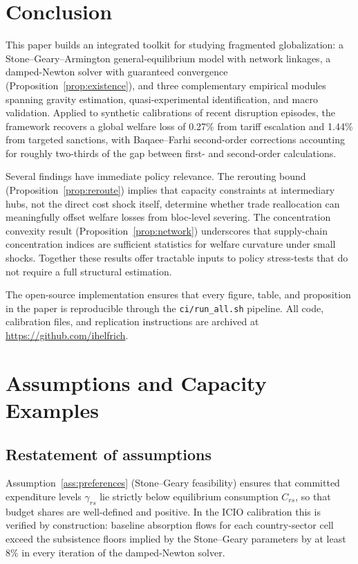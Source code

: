 \documentclass[12pt]{article}
\begin{document}
\section{Conclusion}
This paper builds an integrated toolkit for studying fragmented globalization: a Stone--Geary--Armington general-equilibrium model with network linkages, a damped-Newton solver with guaranteed convergence (Proposition~\ref{prop:existence}), and three complementary empirical modules spanning gravity estimation, quasi-experimental identification, and macro validation. Applied to synthetic calibrations of recent disruption episodes, the framework recovers a global welfare loss of 0.27\% from tariff escalation and 1.44\% from targeted sanctions, with Baqaee--Farhi second-order corrections accounting for roughly two-thirds of the gap between first- and second-order calculations.

Several findings have immediate policy relevance. The rerouting bound (Proposition~\ref{prop:reroute}) implies that capacity constraints at intermediary hubs, not the direct cost shock itself, determine whether trade reallocation can meaningfully offset welfare losses from bloc-level severing. The concentration convexity result (Proposition~\ref{prop:network}) underscores that supply-chain concentration indices are sufficient statistics for welfare curvature under small shocks. Together these results offer tractable inputs to policy stress-tests that do not require a full structural estimation.

The open-source implementation ensures that every figure, table, and proposition in the paper is reproducible through the \texttt{ci/run\_all.sh} pipeline. All code, calibration files, and replication instructions are archived at \url{https://github.com/ihelfrich}.

\appendix


\section{Assumptions and Capacity Examples}\label{app:assumptions}

\subsection*{Restatement of assumptions}

Assumption~\ref{ass:preferences} (Stone--Geary feasibility) ensures that committed expenditure levels $\gamma_{rs}$ lie strictly below equilibrium consumption $C_{rs}$, so that budget shares are well-defined and positive. In the ICIO calibration this is verified by construction: baseline absorption flows for each country-sector cell exceed the subsistence floors implied by the Stone--Geary parameters by at least 8\% in every iteration of the damped-Newton solver.
\end{document}
